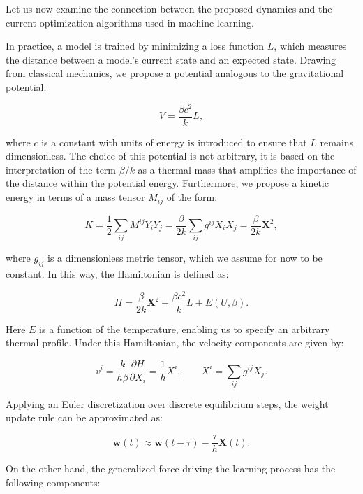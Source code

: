 \documentclass[12pt]{article}
\begin{document}
Let us now examine the connection between the proposed dynamics and the current optimization algorithms used in machine learning.

In practice, a model is trained by minimizing a loss function $L$, which measures the distance between a model's current state and an expected state. Drawing from classical mechanics, we propose a potential analogous to the gravitational potential:

\begin{equation}
V = \frac{\beta c^2}{k} L,
\end{equation}

where $c$ is a constant with units of energy is introduced to ensure that $L$ remains dimensionless. The choice of this potential is not arbitrary, it is based on the interpretation of the term $\beta/k$ as a thermal mass that amplifies the importance of the distance within the potential energy. Furthermore, we propose a kinetic energy in terms of a mass tensor $M_{ij}$ of the form:

\begin{equation}
K = \frac{1}{2} \sum_{i j} M^{ij} Y_{i} Y_{j} = \frac{\beta}{2k}\sum_{ij} g^{ij}X_{i} X_{j} = \frac{\beta}{2k} \mathbf{X}^2,
\end{equation}

where $g_{ij}$ is a dimensionless metric tensor, which we assume for now to be constant. In this way, the Hamiltonian is defined as:

\begin{equation}
H = \frac{\beta}{2k} \mathbf{X}^2 + \frac{\beta c^2}{k} L + E(U, \beta).
\end{equation}

Here $E$ is a function of the temperature, enabling us to specify an arbitrary thermal profile. Under this Hamiltonian, the velocity components are given by:

\begin{equation}
v^{i} = \frac{k}{h\beta} \frac{\partial H}{\partial X_{i}} = \frac{1}{h} X^{i}, \qquad  X^{i} = \sum_{ij}g^{ij}X_j.
\end{equation}

Applying an Euler discretization over discrete equilibrium steps, the weight update rule can be approximated as:

\begin{equation}
\mathbf{w}(t) \approx \mathbf{w}(t-\tau) - \frac{\tau}{h} \mathbf{X}(t).
\end{equation}

On the other hand, the generalized force driving the learning process has the following components:
\end{document}

